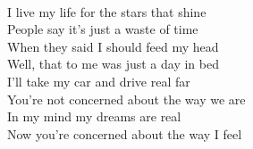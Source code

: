 \\
I live my life for the stars that shine \\
People say it's just a waste of time \\
When they said I should feed my head \\
Well, that to me was just a day in bed \\
I'll take my car and drive real far \\
You're not concerned about the way we are \\
In my mind my dreams are real \\
Now you're concerned about the way I feel \\
